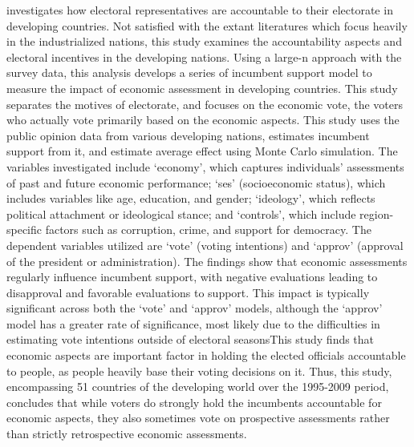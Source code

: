   investigates how electoral representatives are accountable to their electorate in developing countries. Not satisfied with the extant literatures which focus heavily in the industrialized nations, this study examines the accountability aspects and electoral incentives in the developing nations. Using a large-n approach with the survey data, this analysis develops a series of incumbent support model to measure the impact of economic assessment in developing countries. This study separates the motives of electorate, and focuses on the economic vote, the voters who actually vote primarily based on the economic aspects. This study uses the public opinion data from various developing nations, estimates incumbent support from it, and estimate average effect using Monte Carlo simulation.  The variables investigated include `economy', which captures individuals' assessments of past and future economic performance; `ses' (socioeconomic status), which includes variables like age, education, and gender; `ideology', which reflects political attachment or ideological stance; and `controls', which include region-specific factors such as corruption, crime, and support for democracy. The dependent variables utilized are `vote' (voting intentions) and `approv' (approval of the president or administration). The findings show that economic assessments regularly influence incumbent support, with negative evaluations leading to disapproval and favorable evaluations to support. This impact is typically significant across both the `vote' and `approv' models, although the `approv' model has a greater rate of significance, most likely due to the difficulties in estimating vote intentions outside of electoral seasonsThis study finds that economic aspects are important factor in holding the elected officials accountable to people, as people heavily base their voting decisions on it. Thus, this study, encompassing 51 countries of the developing world over the 1995-2009 period, concludes that while voters do strongly hold the incumbents accountable for economic aspects, they also sometimes vote on prospective assessments rather than strictly retrospective economic assessments.\par
